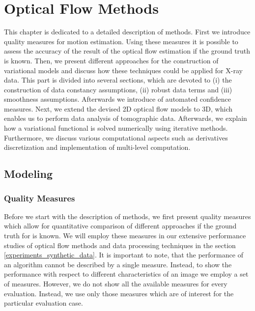 \chapter {Optical Flow Methods}
\label{optical_flow_methods}

This chapter is dedicated to a detailed description of \opticalflow methods. First we introduce quality measures for motion estimation. Using these measures it is possible to assess the accuracy of the result of the optical flow estimation if the ground truth is known. Then, we present different approaches for the construction of variational models and discuss how these techniques could be applied for X-ray data. This part is divided into several sections, which are devoted to (i) the construction of data constancy assumptions, (ii) robust data terms and (iii) smoothness assumptions. Afterwards we introduce of automated confidence measures.
Next, we extend the devised 2D optical flow models to 3D, which enables us to perform data analysis of tomographic data.  Afterwards, we explain how a variational functional is solved numerically using iterative methods. Furthermore, we discuss various computational aspects such as derivatives discretization and implementation of multi-level computation.


\section{Modeling}

\subsection{Quality Measures}
\label{quality_measures}

Before we start with the description of \opticalflow methods, we first present quality measures which allow for quantitative comparison of different approaches if the ground truth  for \opticalflow is known. We will employ these measures in our extensive performance studies of optical flow methods and data processing techniques in the section \ref{experiments_synthetic_data}. It is important to note, that the performance of an algorithm cannot be described by a single measure. Instead, to show the performance with respect to different characteristics of an image we employ a set of measures. However, we do not show all the available measures for every evaluation. Instead, we use only those measures which are of interest for the particular evaluation case.



